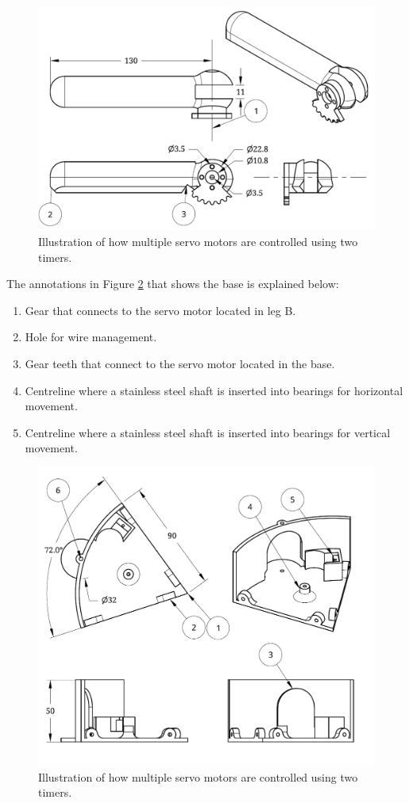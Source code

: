\begin{figure}[H]
\centering
\includegraphics[scale = 0.8]{pics/DrawingC.pdf}
\caption{Illustration of how multiple servo motors are controlled using two timers.}
\label{fig:DrawingC}
\end{figure}

The annotations in Figure \ref{fig:DrawingBase} that shows the base is explained below:
\begin{enumerate}
\item Gear that connects to the servo motor located in leg B.
\item Hole for wire management.
\item Gear teeth that connect to the servo motor located in the base.
\item Centreline where a stainless steel shaft is inserted into bearings for horizontal movement.
\item Centreline where a stainless steel shaft is inserted into bearings for vertical movement.
\end{enumerate}

\begin{figure}[H]
\centering
\includegraphics[scale = 0.8]{pics/DrawingBase.pdf}
\caption{Illustration of how multiple servo motors are controlled using two timers.}
\label{fig:DrawingBase}
\end{figure}

